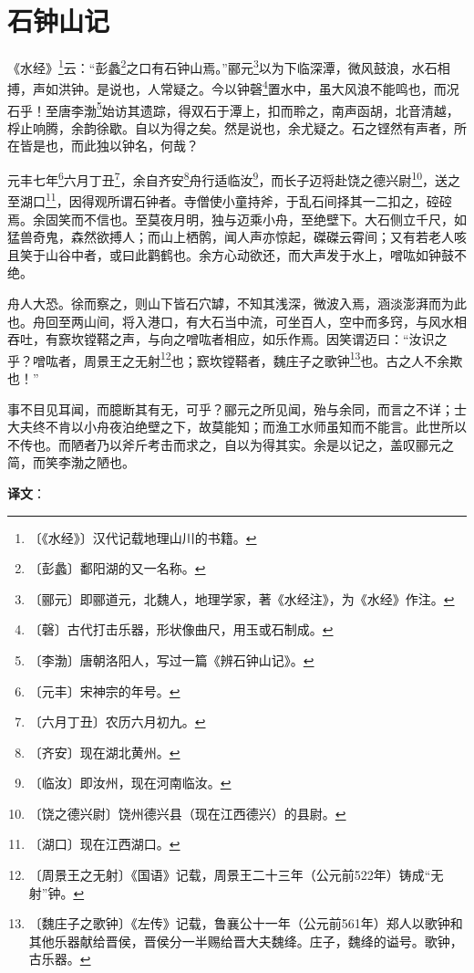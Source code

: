 \documentclass[12pt,UTF-8,openany]{ctexbook}
\begin{document}
\chapter{石钟山记}

\begin{normalsize}
    
    《水经》\footnote{〔《水经》〕汉代记载地理山川的书籍。}云：“彭蠡\footnote{〔彭蠡〕鄱阳湖的又一名称。}之口有石钟山焉。”郦元\footnote{〔郦元〕即郦道元，北魏人，地理学家，著《水经注》，为《水经》作注。}以为下临深潭，微风鼓浪，水石相搏，声如洪钟。是说也，人常疑之。今以钟磬\footnote{〔磬〕古代打击乐器，形状像曲尺，用玉或石制成。}置水中，虽大风浪不能鸣也，而况石乎！至唐李渤\footnote{〔李渤〕唐朝洛阳人，写过一篇《辨石钟山记》。}始访其遗踪，得双石于潭上，扣而聆之，南声函胡，北音清越，桴止响腾，余韵徐歇。自以为得之矣。然是说也，余尤疑之。石之铿然有声者，所在皆是也，而此独以钟名，何哉？
    
    元丰七年\footnote{〔元丰〕宋神宗的年号。}六月丁丑\footnote{〔六月丁丑〕农历六月初九。}，余自齐安\footnote{〔齐安〕现在湖北黄州。}舟行适临汝\footnote{〔临汝〕即汝州，现在河南临汝。}，而长子迈将赴饶之德兴尉\footnote{〔饶之德兴尉〕饶州德兴县（现在江西德兴）的县尉。}，送之至湖口\footnote{〔湖口〕现在江西湖口。}，因得观所谓石钟者。寺僧使小童持斧，于乱石间择其一二扣之，硿硿焉。余固笑而不信也。至莫夜月明，独与迈乘小舟，至绝壁下。大石侧立千尺，如猛兽奇鬼，森然欲搏人；而山上栖鹘，闻人声亦惊起，磔磔云霄间；又有若老人咳且笑于山谷中者，或曰此鹳鹤也。余方心动欲还，而大声发于水上，噌吰如钟鼓不绝。
    
    舟人大恐。徐而察之，则山下皆石穴罅，不知其浅深，微波入焉，涵淡澎湃而为此也。舟回至两山间，将入港口，有大石当中流，可坐百人，空中而多窍，与风水相吞吐，有窾坎镗鞳之声，与向之噌吰者相应，如乐作焉。因笑谓迈曰：“汝识之乎？噌吰者，周景王之无射\footnote{〔周景王之无射〕《国语》记载，周景王二十三年（公元前522年）铸成“无射”钟。}也；窾坎镗鞳者，魏庄子之歌钟\footnote{〔魏庄子之歌钟〕《左传》记载，鲁襄公十一年（公元前561年）郑人以歌钟和其他乐器献给晋侯，晋侯分一半赐给晋大夫魏绛。庄子，魏绛的谥号。歌钟，古乐器。}也。古之人不余欺也！”
    
    事不目见耳闻，而臆断其有无，可乎？郦元之所见闻，殆与余同，而言之不详；士大夫终不肯以小舟夜泊绝壁之下，故莫能知；而渔工水师虽知而不能言。此世所以不传也。而陋者乃以斧斤考击而求之，自以为得其实。余是以记之，盖叹郦元之简，而笑李渤之陋也。
\end{normalsize}


\newpage

\textbf{译文}：
\end{document}
